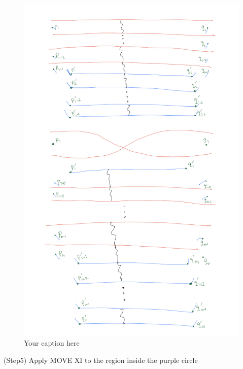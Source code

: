\begin{figure}[H] %
    \centering
    \includegraphics[width=\linewidth]{diagrams/definition12/12.png} %
    \caption{Your caption here}
    \label{fig:your-label}
\end{figure}

(Step5) Apply MOVE \RN{11} to the region inside the purple circle

